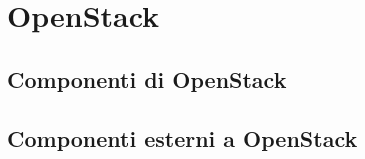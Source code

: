 \section{OpenStack}

\subsection{Componenti di OpenStack}

\subsection{Componenti esterni a OpenStack}